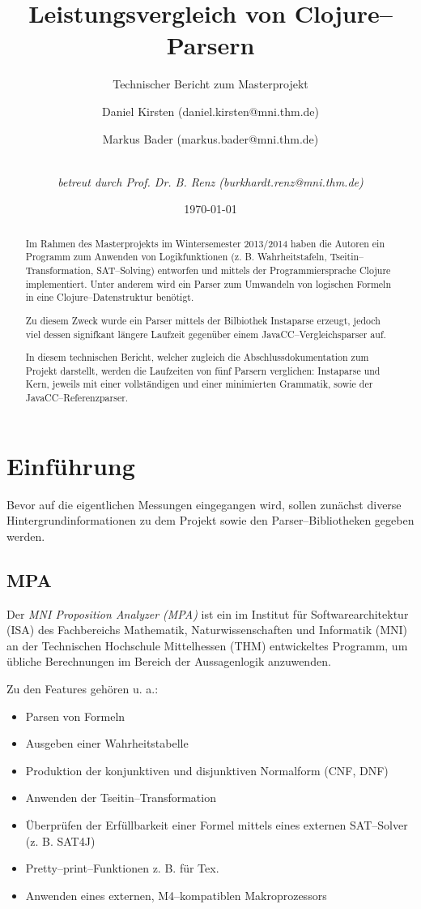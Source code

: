 \documentclass[ngerman,a4paper,abstracton,open=right,twoside=false,toc=listofnumbered,bibtotocnumbered]{scrreprt}
\title{Leistungsvergleich von Clojure--Parsern}
\subtitle{Technischer Bericht zum Masterprojekt}
\author{Daniel Kirsten (daniel.kirsten@mni.thm.de)
\and
Markus Bader (markus.bader@mni.thm.de)
\and\\
\emph{betreut durch Prof. Dr. B. Renz (burkhardt.renz@mni.thm.de)}
}
\date{\today}
\begin{document}
\maketitle
\newpage
\begin{abstract}

Im Rahmen des Masterprojekts im Wintersemester 2013/2014 haben die Autoren ein Programm zum Anwenden von Logikfunktionen (z. B. Wahrheitstafeln, Tseitin--Transformation, SAT--Solving) entworfen und mittels der Programmiersprache Clojure implementiert. Unter anderem wird ein Parser zum Umwandeln von logischen Formeln in eine Clojure--Datenstruktur benötigt.

Zu diesem Zweck wurde ein Parser mittels der Bilbiothek Instaparse erzeugt, jedoch viel dessen signifkant längere Laufzeit gegenüber einem JavaCC--Vergleichsparser auf.

In diesem technischen Bericht, welcher zugleich die Abschlussdokumentation zum Projekt darstellt, werden die Laufzeiten von fünf Parsern verglichen: Instaparse und Kern, jeweils mit einer vollständigen und einer minimierten Grammatik, sowie der JavaCC--Referenzparser.

\end{abstract}
\newpage
\tableofcontents
\newpage

\chapter{Einführung}

Bevor auf die eigentlichen Messungen eingegangen wird, sollen zunächst diverse Hintergrundinformationen zu dem Projekt sowie den Parser--Bibliotheken gegeben werden.

\section{MPA}

Der \emph{MNI Proposition Analyzer (MPA)} ist ein im Institut für Softwarearchitektur (ISA) des Fachbereichs Mathematik, Naturwissenschaften und Informatik (MNI) an der Technischen Hochschule Mittelhessen (THM) entwickeltes Programm, um übliche Berechnungen im Bereich der Aussagenlogik anzuwenden. \cite{mpa}

Zu den Features gehören u. a.:

\begin{itemize}
	\item Parsen von Formeln
	\item Ausgeben einer Wahrheitstabelle
	\item Produktion der konjunktiven und disjunktiven Normalform (CNF, DNF)
	\item Anwenden der Tseitin--Transformation
	\item Überprüfen der Erfüllbarkeit einer Formel mittels eines externen SAT--Solver (z. B. SAT4J)
	\item Pretty--print--Funktionen z. B. für Tex.
	\item Anwenden eines externen, M4--kompatiblen Makroprozessors
\end{itemize}
\end{document}
